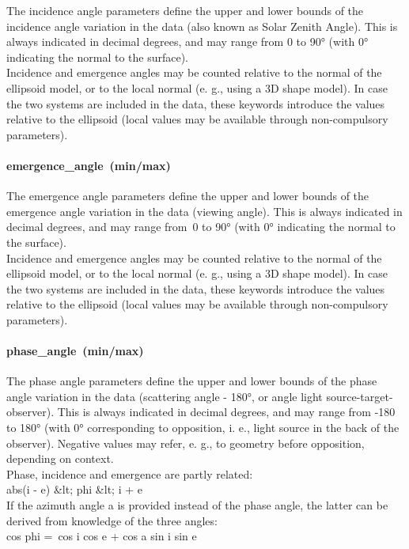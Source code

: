 \documentclass[11pt,a4paper]{ivoa}
\begin{document}
The incidence angle parameters define the upper and lower bounds of the incidence angle variation in the data (also known as Solar Zenith Angle). This is always indicated in decimal degrees, and may range from 0 to 90° (with 0° indicating the normal to the surface).\\ Incidence and emergence angles may be counted relative to the normal of the ellipsoid model, or to the local normal (e. g., using a 3D shape model). In case the two systems are included in the data, these keywords introduce the values relative to the ellipsoid (local values may be available through non-compulsory parameters).

\paragraph{emergence\_angle (min/max)}

The emergence angle parameters define the upper and lower bounds of the emergence angle variation in the data (viewing angle). This is always indicated in decimal degrees, and may range from 0 to 90° (with 0° indicating the normal to the surface).\\ Incidence and emergence angles may be counted relative to the normal of the ellipsoid model, or to the local normal (e. g., using a 3D shape model). In case the two systems are included in the data, these keywords introduce the values relative to the ellipsoid (local values may be available through non-compulsory parameters).

\paragraph{phase\_angle (min/max)}

The phase angle parameters define the upper and lower bounds of the phase angle variation in the data (scattering angle - 180°, or angle light source-target-observer). This is always indicated in decimal degrees, and may range from -180 to 180° (with 0° corresponding to opposition, i. e., light source in the back of the observer). Negative values may refer, e. g., to geometry before opposition, depending on context.\\ Phase, incidence and emergence are partly related:\\ abs(i - e) \&lt; phi \&lt; i + e\\ If the azimuth angle a is provided instead of the phase angle, the latter can be derived from knowledge of the three angles:\\ cos phi = cos i cos e + cos a sin i sin e
\end{document}
